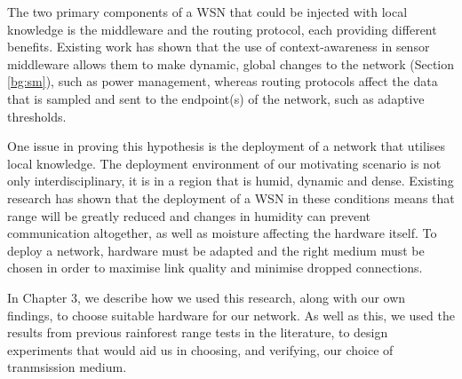 The two primary components of a WSN that could be injected with local knowledge is the middleware and the routing protocol, each providing different benefits. Existing work has shown that the use of context-awareness in sensor middleware allows them to make dynamic, global changes to the network (Section \ref{bg:sm}), such as power management, whereas routing protocols affect the data that is sampled and sent to the endpoint(s) of the network, such as adaptive thresholds.

One issue in proving this hypothesis is the deployment of a network that utilises local knowledge. The deployment environment of our motivating scenario is not only interdisciplinary, it is in a region that is humid, dynamic and dense. Existing research has shown that the deployment of a WSN in these conditions means that range will be greatly reduced \cite{Figueiredo2009} and changes in humidity can prevent communication altogether, as well as moisture affecting the hardware itself.
To deploy a network, hardware must be adapted and the right medium must be chosen in order to maximise link quality and minimise dropped connections.

In Chapter 3, we describe how we used this research, along with our own findings, to choose suitable hardware for our network. As well as this, we used the results from previous rainforest range tests in the literature, to design  experiments that would aid us in choosing, and verifying, our choice of tranmsission medium.

